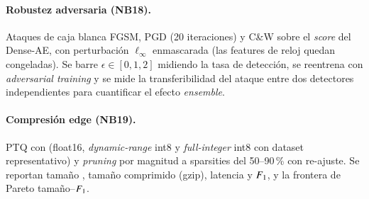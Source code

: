 \paragraph{Robustez adversaria (NB18).} Ataques de caja blanca FGSM, PGD (20 iteraciones) y C\&W sobre el \textit{score} del Dense-AE, con perturbación $\ell_\infty$ enmascarada (las features de reloj quedan congeladas). Se barre $\epsilon\in[0,1{,}2]$ midiendo la tasa de detección, se reentrena con \emph{adversarial training} y se mide la transferibilidad del ataque entre dos detectores independientes para cuantificar el efecto \emph{ensemble}.

\paragraph{Compresión edge (NB19).} PTQ con  (float16, \emph{dynamic-range} int8 y \emph{full-integer} int8 con dataset representativo) y \emph{pruning} por magnitud a sparsities del 50--90\,\% con re-ajuste. Se reportan tamaño , tamaño comprimido (gzip), latencia y $F_{1}$, y la frontera de Pareto tamaño--$F_{1}$.
